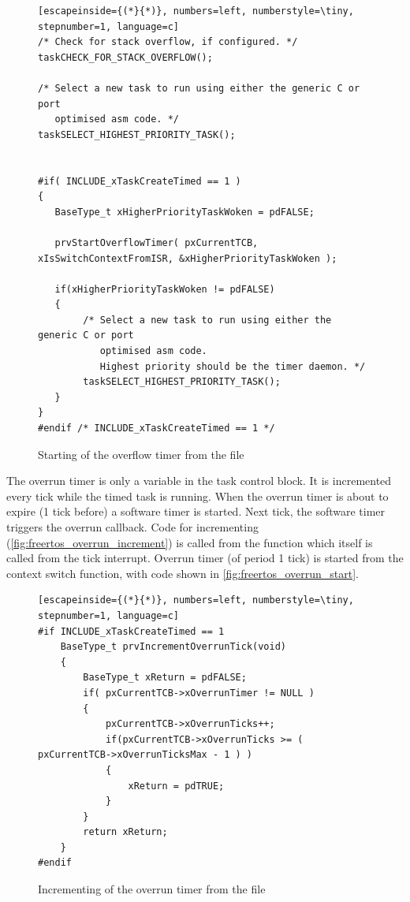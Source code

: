 \begin{figure}[H]
\begin{changemargin}{1cm}{1cm}
\begin{lstlisting}[escapeinside={(*}{*)}, numbers=left, numberstyle=\tiny, stepnumber=1, language=c]
/* Check for stack overflow, if configured. */
taskCHECK_FOR_STACK_OVERFLOW();

/* Select a new task to run using either the generic C or port
   optimised asm code. */
taskSELECT_HIGHEST_PRIORITY_TASK();


#if( INCLUDE_xTaskCreateTimed == 1 )
{
   BaseType_t xHigherPriorityTaskWoken = pdFALSE;

   prvStartOverflowTimer( pxCurrentTCB, xIsSwitchContextFromISR, &xHigherPriorityTaskWoken );

   if(xHigherPriorityTaskWoken != pdFALSE)
   {
        /* Select a new task to run using either the generic C or port
           optimised asm code.
           Highest priority should be the timer daemon. */
        taskSELECT_HIGHEST_PRIORITY_TASK();
   }
}
#endif /* INCLUDE_xTaskCreateTimed == 1 */
\end{lstlisting}  
\end{changemargin}
\caption{Starting of the overflow timer from the file }
\label{fig:freertos_overflow_start}
\end{figure}

The overrun timer is only a variable in the task control block. It is incremented every tick while the timed task is running. When the overrun timer is about to expire (1 tick before) a software timer is started. Next tick, the software timer triggers the overrun callback. Code for incrementing (\autoref{fig:freertos_overrun_increment}) is called from the function  which itself is called from the tick interrupt. Overrun timer (of period 1 tick) is started from the context switch function, with code shown in \autoref{fig:freertos_overrun_start}.

\begin{figure}[H]
\begin{changemargin}{1cm}{1cm}
\begin{lstlisting}[escapeinside={(*}{*)}, numbers=left, numberstyle=\tiny, stepnumber=1, language=c]
#if INCLUDE_xTaskCreateTimed == 1
    BaseType_t prvIncrementOverrunTick(void)
    {
        BaseType_t xReturn = pdFALSE;
        if( pxCurrentTCB->xOverrunTimer != NULL )
        {
            pxCurrentTCB->xOverrunTicks++;
            if(pxCurrentTCB->xOverrunTicks >= ( pxCurrentTCB->xOverrunTicksMax - 1 ) )
            {
                xReturn = pdTRUE;
            }
        }
        return xReturn;
    }
#endif
\end{lstlisting}  
\end{changemargin}

\caption{Incrementing of the overrun timer from the file }
\label{fig:freertos_overrun_increment}
    
\end{figure}

